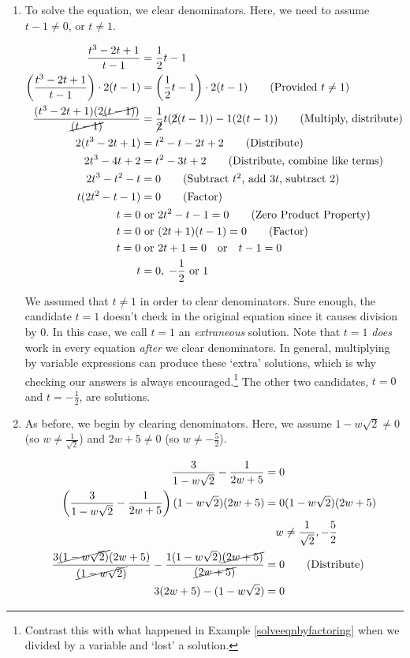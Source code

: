 \begin{ex}
\begin{enumerate}
\item  To solve the equation, we clear denominators.  Here, we need to assume $t-1 \neq 0$, or $t \neq 1$.

\begin{align*}
\dfrac{t^3-2t+1}{t-1} & = \dfrac{1}{2}t-1 \\ 
\left(\dfrac{t^3-2t+1}{t-1}\right) \cdot 2(t-1) & = \left( \dfrac{1}{2}t-1 \right) \cdot 2(t-1) \tag{Provided $t \neq 1$} \\ 
\dfrac{(t^3-2t+1)(2\cancel{(t-1)})}{\cancel{(t-1)}}  & = \dfrac{1}{\cancel{2}} t (\cancel{2}(t-1)) - 1(2(t-1))  \tag{Multiply, distribute} \\ 
2(t^3-2t+1) & = t^2 - t - 2t + 2 \tag{Distribute} \\ 
2t^3 - 4t + 2 & = t^2 -3t + 2 \tag{Distribute, combine like terms} \\ 
2t^3 -t^2 - t & = 0 \tag{Subtract $t^2$, add $3t$, subtract $2$}\\ 
t(2t^2 -t - 1) & = 0 \tag{Factor} \\ 
t = 0 & \text{ or } 2t^2 - t - 1 = 0 \tag{Zero Product Property}\\
t = 0 & \text{ or } (2t+1)(t-1) = 0 \tag{Factor}\\
t = 0 & \text{ or } 2t+1 = 0 \quad \text{or} \quad t-1 = 0 \\
t & = 0, \; -\dfrac{1}{2} \text{ or } 1 \\
\end{align*}

We assumed that $t \neq 1$ in order to clear denominators.  Sure enough, the candidate $t = 1$ doesn't check in the original equation since it causes division by $0$.  In this case, we call $t = 1$ an \textit{extraneous} solution.  Note that $t=1$ \textit{does} work in every equation \textit{after} we clear denominators.  In general, multiplying by variable expressions can produce these `extra' solutions, which is why checking our answers is always encouraged.\footnote{Contrast this with what happened in  Example \ref{solveeqnbyfactoring} when we divided by a variable and `lost' a solution.}  The other two candidates, $t = 0$ and $t = -\frac{1}{2}$, are solutions.

\item  As before, we begin by clearing denominators.  Here, we assume $1 - w\sqrt{2} \neq 0$ (so $w \neq \frac{1}{\sqrt{2}}$) and $2w+5 \neq 0$ (so $w \neq -\frac{5}{2}$).

\begin{align*}
\dfrac{3}{1 - w\sqrt{2}} - \dfrac{1}{2w+5} & =  0 \\
\left(\dfrac{3}{1 - w\sqrt{2}} - \dfrac{1}{2w+5}\right)(1 - w\sqrt{2})(2w+5) & =  0 (1 - w\sqrt{2})(2w+5) \\
&{} \quad w \neq \dfrac{1}{\sqrt{2}}, -\dfrac{5}{2} \\ 
\dfrac{3\cancel{(1 - w\sqrt{2})}(2w+5) }{\cancel{(1 - w\sqrt{2})}}- \dfrac{1(1 - w\sqrt{2})\cancel{(2w+5)}}{\cancel{(2w+5)}} & = 0 \tag{Distribute} \\ 
3(2w+5) - (1-w\sqrt{2}) & = 0 \\
\end{align*}


\end{enumerate}
\end{ex}
